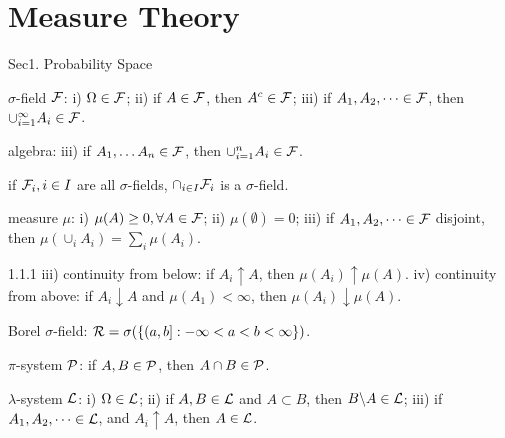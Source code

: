 \section*{Measure Theory}

\vspace{-2ex}

Sec1. Probability Space \hrulefill

\begin{defi}
    $\sigma$-field $\mathcal{F}$: i) $\Omega \in \mathcal{F}$; ii) if $A \in \mathcal{F}$, then ${A}^c \in \mathcal{F}$; \newline 
    iii) if $A_1, A_2, \dots \in \mathcal{F}$, then $\cup_{i=1}^\infty A_i \in \mathcal{F}$.
    
    algebra: iii) if $A_1, \dots A_n \in \mathcal{F}$, then $\cup_{i=1}^n A_i \in \mathcal{F}$.
\end{defi}

\begin{fact}
    if $\mathcal{F}_i, i\in I$ are all $\sigma$-fields, $\cap_{i\in I} \mathcal{F}_i$ is a $\sigma$-field.
\end{fact}

\begin{defi}
    measure $\mu$: i) $\mu(A) \geq 0, \forall A \in \mathcal{F}$; ii) $\mu(\emptyset) = 0$; \newline
    iii) if $A_1, A_2, \dots \in \mathcal{F}$ disjoint, then $\mu(\cup_i A_i) = \sum_i \mu(A_i)$.
\end{defi}

\begin{thm}{1.1.1}
    iii) continuity from below: if $A_i \uparrow A$, then $\mu(A_i) \uparrow \mu(A)$.
    iv) continuity from above: if $A_i \downarrow A$ and $\mu(A_1) < \infty$, then $\mu(A_i) \downarrow \mu(A)$.
\end{thm}

\begin{defi}
    Borel $\sigma$-field: $\mathcal{R} = \sigma(\{(a, b]: -\infty < a < b < \infty\})$.
\end{defi}

\begin{defi}
    $\pi$-system $\mathcal{P}$: if $A, B \in \mathcal{P}$, then $A \cap B \in \mathcal{P}$.
    
    $\lambda$-system $\mathcal{L}$: 
        i) $\Omega \in \mathcal{L}$; 
        ii) if $A, B \in \mathcal{L}$ and $A \subset B$, then $B\backslash A \in \mathcal{L}$; \newline
        iii) if $A_1, A_2, \dots \in \mathcal{L}$, and $A_i \uparrow A$, then $A \in \mathcal{L}$.
\end{defi}

